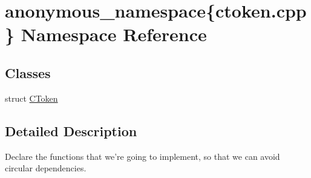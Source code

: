 \hypertarget{namespaceanonymous__namespace_02ctoken_8cpp_03}{\section{anonymous\-\_\-namespace\{ctoken.\-cpp\} Namespace Reference}
\label{namespaceanonymous__namespace_02ctoken_8cpp_03}
}
\subsection*{Classes}
\begin{DoxyCompactItemize}
\item 
struct \hyperlink{structanonymous__namespace_02ctoken_8cpp_03_1_1CToken}{C\-Token}
\end{DoxyCompactItemize}


\subsection{Detailed Description}
Declare the functions that we're going to implement, so that we can avoid circular dependencies. 